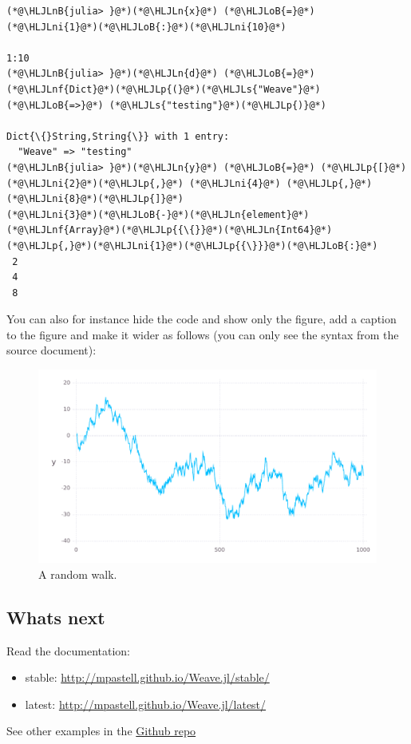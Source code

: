 \documentclass[12pt,a4paper]{article}
\newcommand{\HLJLn}[1]{#1}
\newcommand{\HLJLnf}[1]{\textcolor[RGB]{66,102,213}{#1}}
\newcommand{\HLJLs}[1]{\textcolor[RGB]{201,61,57}{#1}}
\newcommand{\HLJLnB}[1]{\textcolor[RGB]{59,151,46}{#1}}
\newcommand{\HLJLni}[1]{\textcolor[RGB]{59,151,46}{#1}}
\newcommand{\HLJLoB}[1]{\textcolor[RGB]{102,102,102}{\textbf{#1}}}
\newcommand{\HLJLp}[1]{#1}
\begin{document}
\begin{lstlisting}
(*@\HLJLnB{julia> }@*)(*@\HLJLn{x}@*) (*@\HLJLoB{=}@*) (*@\HLJLni{1}@*)(*@\HLJLoB{:}@*)(*@\HLJLni{10}@*)

1:10
(*@\HLJLnB{julia> }@*)(*@\HLJLn{d}@*) (*@\HLJLoB{=}@*) (*@\HLJLnf{Dict}@*)(*@\HLJLp{(}@*)(*@\HLJLs{"Weave"}@*) (*@\HLJLoB{=>}@*) (*@\HLJLs{"testing"}@*)(*@\HLJLp{)}@*)

Dict{\{}String,String{\}} with 1 entry:
  "Weave" => "testing"
(*@\HLJLnB{julia> }@*)(*@\HLJLn{y}@*) (*@\HLJLoB{=}@*) (*@\HLJLp{[}@*)(*@\HLJLni{2}@*)(*@\HLJLp{,}@*) (*@\HLJLni{4}@*) (*@\HLJLp{,}@*)(*@\HLJLni{8}@*)(*@\HLJLp{]}@*)
(*@\HLJLni{3}@*)(*@\HLJLoB{-}@*)(*@\HLJLn{element}@*) (*@\HLJLnf{Array}@*)(*@\HLJLp{{\{}}@*)(*@\HLJLn{Int64}@*)(*@\HLJLp{,}@*)(*@\HLJLni{1}@*)(*@\HLJLp{{\}}}@*)(*@\HLJLoB{:}@*)
 2
 4
 8
\end{lstlisting}


You can also for instance hide the code and show only the figure, add a caption to the figure and make it wider as follows (you can only see the syntax from the source document):

\begin{figure}[!h]
\center
\includegraphics{figures/gadfly_md_sample_random_1.pdf}
\caption{A random walk.}
\label{fig:random}
\end{figure}

\subsection{Whats next}

Read the documentation:
\begin{itemize}
\item 
stable: \href{http://mpastell.github.io/Weave.jl/stable/}{http://mpastell.github.io/Weave.jl/stable/}

\item 
latest: \href{http://mpastell.github.io/Weave.jl/latest/}{http://mpastell.github.io/Weave.jl/latest/}
\end{itemize}

See other examples in the \href{https://github.com/mpastell/Weave.jl/tree/master/examples}{Github repo}
\end{document}
